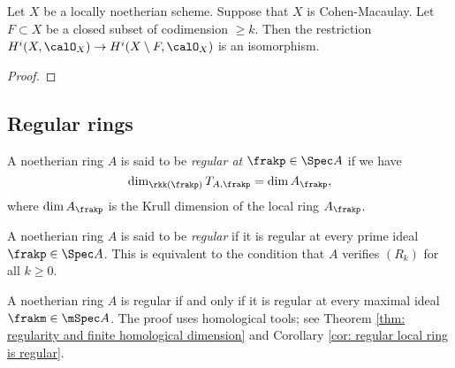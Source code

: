     \begin{theorem}\label{thm: higher dimensional hartogs lemma for Cohen-Macaulay schemes}
        Let $X$ be a locally noetherian scheme.
        Suppose that $X$ is Cohen-Macaulay.
        Let $F \subset X$ be a closed subset of codimension $\geq k$.
        Then the restriction $H^i(X,\calO_X) \to H^i(X\setminus F, \calO_{X})$ is an isomorphism.
    \end{theorem}
    \begin{proof}
    \end{proof}

    
\subsection{Regular rings}





    \begin{definition}\label{def: regular ring}
        A noetherian ring \(A\) is said to be \emph{regular at \(\frakp \in \Spec A\)} if we have 
        \[ \dim_{\rkk(\frakp)} T_{A,\frakp} = \dim A_\frakp, \]
        where \(\dim A_\frakp\) is the Krull dimension of the local ring \(A_\frakp\).
        
        A noetherian ring \(A\) is said to be \emph{regular} if it is regular at every prime ideal \(\frakp \in \Spec A\).
        This is equivalent to the condition that \(A\) verifies \((R_k)\) for all \(k \geq 0\).
    \end{definition}

    \begin{remark}\label{prop: regularity is a local property}
        A noetherian ring \(A\) is regular if and only if it is regular at every maximal ideal \(\frakm \in \mSpec A\). 
        The proof uses homological tools; see Theorem \ref{thm: regularity and finite homological dimension} and Corollary \ref{cor: regular local ring is regular}.
    \end{remark}


